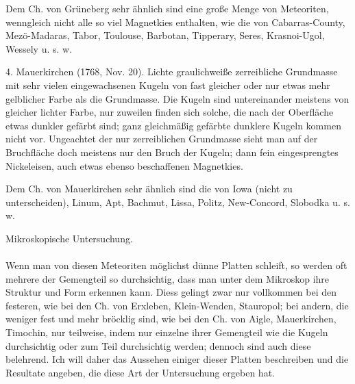 \documentclass[a4paper, 11pt, oneside]{article}
\begin{document}
Dem Ch. von Grüneberg sehr ähnlich sind eine große Menge von Meteoriten, wenngleich nicht alle so viel Magnetkies enthalten, wie die von Cabarras-County, Mezö-Madaras, Tabor, Toulouse, Barbotan, Tipperary, Seres, Krasnoi-Ugol, Wessely u. s. w.

4. Mauerkirchen (1768, Nov. 20). Lichte graulichweiße zerreibliche Grundmasse mit sehr vielen eingewachsenen Kugeln von fast gleicher oder nur etwas mehr gelblicher Farbe als die Grundmasse. Die Kugeln sind untereinander meistens von gleicher lichter Farbe, nur zuweilen finden sich solche, die nach der Oberfläche etwas dunkler gefärbt sind; ganz gleichmäßig gefärbte dunklere Kugeln kommen nicht vor. Ungeachtet der nur zerreiblichen Grundmasse sieht man auf der Bruchfläche doch meistens nur den Bruch der Kugeln; dann fein eingesprengtes Nickeleisen, auch etwas ebenso beschaffenen Magnetkies.

Dem Ch. von Mauerkirchen sehr ähnlich sind die von Iowa (nicht zu unterscheiden), Linum, Apt, Bachmut, Lissa, Politz, New-Concord, Slobodka u. s. w.
\begin{center}
Mikroskopische Untersuchung.
\end{center}
\paragraph{}
Wenn man von diesen Meteoriten möglichst dünne Platten schleift, so werden oft mehrere der Gemengteil so durchsichtig, dass man unter dem Mikroskop ihre Struktur und Form erkennen kann. Diess gelingt zwar nur vollkommen bei den festeren, wie bei den Ch. von Erxleben, Klein-Wenden, Stauropol; bei andern, die weniger fest und mehr bröcklig sind, wie bei den Ch. von Aigle, Mauerkirchen, Timochin, nur teilweise, indem nur einzelne ihrer Gemengteil wie die Kugeln durchsichtig oder zum Teil durchsichtig werden; dennoch sind auch diese belehrend. Ich will daher das Aussehen einiger dieser Platten beschreiben und die Resultate angeben, die diese Art der Untersuchung ergeben hat.
\end{document}
